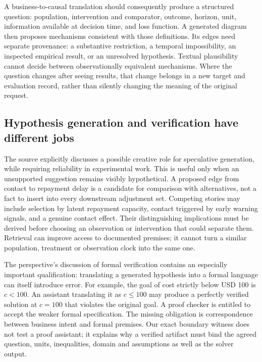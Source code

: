 A business-to-causal translation should consequently produce a structured question:
population, intervention and comparator, outcome, horizon, unit, information available
at decision time, and loss function. A generated diagram then proposes mechanisms
consistent with those definitions. Its edges need separate provenance: a substantive
restriction, a temporal impossibility, an inspected empirical result, or an
unresolved hypothesis. Textual plausibility cannot decide between observationally
equivalent mechanisms. Where the question changes after seeing results, that change
belongs in a new target and evaluation record, rather than silently changing the
meaning of the original request.

\subsection{Hypothesis generation and verification have different jobs}

The source explicitly discusses a possible creative role for speculative generation,
while requiring reliability in experimental work. This is useful only when an
unsupported suggestion remains visibly hypothetical. A proposed edge from contact
to repayment delay is a candidate for comparison with alternatives,
not a fact to insert into every downstream adjustment set. Competing stories may
include selection by latent repayment capacity, contact triggered by early warning
signals, and a genuine contact effect. Their distinguishing implications must be
derived before choosing an observation or intervention that could separate them.
Retrieval can improve access to documented premises; it cannot turn a similar
population, treatment or observation clock into the same one.

The perspective's discussion of formal verification contains an especially important
qualification: translating a generated hypothesis into a formal language can itself
introduce error. For example, the goal of cost strictly below USD 100 is
$c<100$. An assistant translating it as $c\leq100$ may produce a perfectly verified
solution at $c=100$ that violates the original goal. A proof checker is entitled to
accept the weaker formal specification. The missing obligation is correspondence
between business intent and formal premises. Our exact boundary witness does not
test a proof assistant; it explains why a verified artifact must bind the agreed
question, units, inequalities, domain and assumptions as well as the solver output.
\citep{exec24_scimethod_original,exec24_scimethod_reference}

